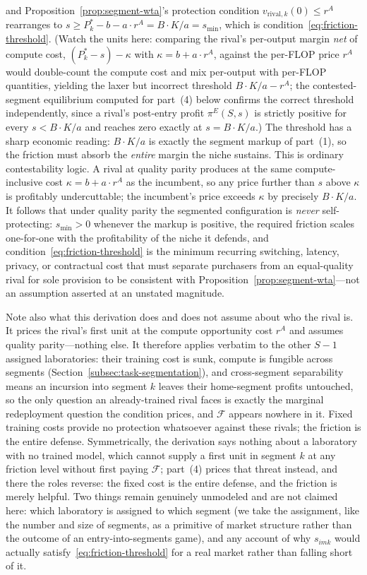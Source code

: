 \documentclass[11pt]{article}
\begin{document}
and Proposition~\ref{prop:segment-wta}'s protection condition $v_{\mathrm{rival},k}(0)\leq r^A$ rearranges to $s\geq P_k^*-b-a\cdot r^A=B\cdot K/a=s_{\min}$, which is condition~\eqref{eq:friction-threshold}. (Watch the units here: comparing the rival's per-output margin \emph{net} of compute cost, $(P_k^*-s)-\kappa$ with $\kappa=b+a\cdot r^A$, against the per-FLOP price $r^A$ would double-count the compute cost and mix per-output with per-FLOP quantities, yielding the laxer but incorrect threshold $B\cdot K/a-r^A$; the contested-segment equilibrium computed for part~(4) below confirms the correct threshold independently, since a rival's post-entry profit $\pi^{E}(S,s)$ is strictly positive for every $s<B\cdot K/a$ and reaches zero exactly at $s=B\cdot K/a$.) The threshold has a sharp economic reading: $B\cdot K/a$ is exactly the segment markup of part~(1), so the friction must absorb the \emph{entire} margin the niche sustains. This is ordinary contestability logic. A rival at quality parity produces at the same compute-inclusive cost $\kappa=b+a\cdot r^A$ as the incumbent, so any price further than $s$ above $\kappa$ is profitably undercuttable; the incumbent's price exceeds $\kappa$ by precisely $B\cdot K/a$. It follows that under quality parity the segmented configuration is \emph{never} self-protecting: $s_{\min}>0$ whenever the markup is positive, the required friction scales one-for-one with the profitability of the niche it defends, and condition~\eqref{eq:friction-threshold} is the minimum recurring switching, latency, privacy, or contractual cost that must separate purchasers from an equal-quality rival for sole provision to be consistent with Proposition~\ref{prop:segment-wta}---not an assumption asserted at an unstated magnitude.

Note also what this derivation does and does not assume about who the rival is. It prices the rival's first unit at the compute opportunity cost $r^{A}$ and assumes quality parity---nothing else. It therefore applies verbatim to the other $S-1$ assigned laboratories: their training cost is sunk, compute is fungible across segments (Section~\ref{subsec:task-segmentation}), and cross-segment separability means an incursion into segment $k$ leaves their home-segment profits untouched, so the only question an already-trained rival faces is exactly the marginal redeployment question the condition prices, and $\mathcal F$ appears nowhere in it. Fixed training costs provide no protection whatsoever against these rivals; the friction is the entire defense. Symmetrically, the derivation says nothing about a laboratory with no trained model, which cannot supply a first unit in segment $k$ at any friction level without first paying $\mathcal F$; part~(4) prices that threat instead, and there the roles reverse: the fixed cost is the entire defense, and the friction is merely helpful. Two things remain genuinely unmodeled and are not claimed here: which laboratory is assigned to which segment (we take the assignment, like the number and size of segments, as a primitive of market structure rather than the outcome of an entry-into-segments game), and any account of why $s_{imk}$ would actually satisfy~\eqref{eq:friction-threshold} for a real market rather than falling short of it.
\end{document}
